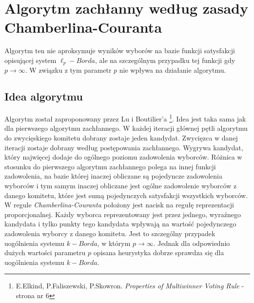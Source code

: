 \documentclass[pdflatex,11pt]{../aghdoc_version2}
\begin{document}
\section{Algorytm zachłanny według zasady Chamberlina-Couranta}
Algorytm ten nie aproksymuje wyników wyborów na bazie funkcji satysfakcji opisującej
system \mbox{$\ell_p-Borda$}, ale na szczególnym przypadku tej funkcji gdy $p \to \infty$. W związku z tym parametr $p$ nie wpływa na działanie algorytmu.

\subsection{Idea algorytmu}
Algorytm został zaproponowany przez Lu i Boutilier’a \footnote{E.Elkind, P.Faliszewski, P.Skowron. \textit{Properties of Multiwinner Voting Rule} - strona nr $6$}. Idea jest taka sama jak dla
pierwszego algorytmu zachłannego. W każdej iteracji głównej pętli algorytmu do
zwycięskiego komitetu dobrany zostaje jeden kandydat. Zwycięzca w danej iteracji zostaje
dobrany według postępowania zachłannego. Wygrywa kandydat, który najwięcej dodaje do
ogólnego poziomu zadowolenia wyborców. Różnica w stosunku do pierwszego algorytmu
zachłannego polega na innej funkcji zadowolenia, na bazie której inaczej obliczane są
pojedyncze zadowolenia wyborców i tym samym inaczej obliczane jest ogólne zadowolenie
wyborców z danego komitetu, które jest sumą pojedynczych satysfakcji wszystkich
wyborców. W regule \textit{Chamberlina-Couranta} położony jest nacisk na regułę reprezentacji proporcjonalnej. Każdy wyborca reprezentowany jest przez jednego, wyraźnego kandydata i
tylko punkty tego kandydata wpływają na wartość pojedynczego zadowolenia wyborcy z
danego komitetu. Jest to szczególny przypadek uogólnienia systemu $k-Borda$, w którym $p \to \infty$. Jednak dla odpowiednio dużych wartości parametru $p$ opisana heurystyka dobrze
sprawdza się dla uogólnienia systemu $k-Borda$.
\end{document}
